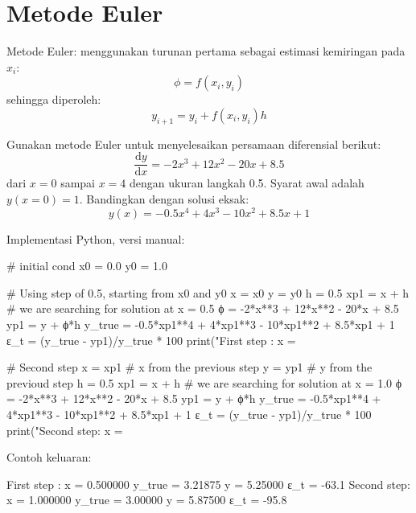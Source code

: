 \section{Metode Euler}

Metode Euler: menggunakan turunan pertama sebagai estimasi kemiringan pada
$x_i$:
\begin{equation*}
\phi = f(x_i, y_i)
\end{equation*}
sehingga diperoleh:
\begin{equation}
y_{i+1} = y_{i} + f(x_i, y_i) h
\label{eq:euler_1step}
\end{equation}


\begin{soal}
Gunakan metode Euler untuk menyelesaikan persamaan diferensial berikut:
\begin{equation*}
\frac{\mathrm{d}y}{\mathrm{d}x} = -2x^3 + 12x^2 - 20x + 8.5
\end{equation*}
dari $x=0$ sampai $x=4$ dengan ukuran langkah 0.5.
Syarat awal adalah $y(x=0) = 1$.
Bandingkan dengan solusi eksak:
\begin{equation*}
y(x) = -0.5x^4 + 4x^3 - 10x^2 + 8.5x + 1
\end{equation*}
\end{soal}

Implementasi Python, versi manual:
\begin{pythoncode}
# initial cond
x0 = 0.0
y0 = 1.0

# Using step of 0.5, starting from x0 and y0
x = x0
y = y0
h = 0.5
xp1 = x + h # we are searching for solution at x = 0.5
ϕ = -2*x**3 + 12*x**2 - 20*x + 8.5
yp1 = y + ϕ*h
y_true = -0.5*xp1**4 + 4*xp1**3 - 10*xp1**2 + 8.5*xp1 + 1
ε_t = (y_true - yp1)/y_true * 100
print("First step : x = %

# Second step
x = xp1 # x from the previous step
y = yp1 # y from the previoud step
h = 0.5
xp1 = x + h # we are searching for solution at x = 1.0
ϕ = -2*x**3 + 12*x**2 - 20*x + 8.5
yp1 = y + ϕ*h
y_true = -0.5*xp1**4 + 4*xp1**3 - 10*xp1**2 + 8.5*xp1 + 1
ε_t = (y_true - yp1)/y_true * 100
print("Second step: x = %
\end{pythoncode}

Contoh keluaran:
\begin{textcode}
First step : x = 0.500000 y_true = 3.21875 y = 5.25000 ε_t = -63.1 %
Second step: x = 1.000000 y_true = 3.00000 y = 5.87500 ε_t = -95.8 %
\end{textcode}


